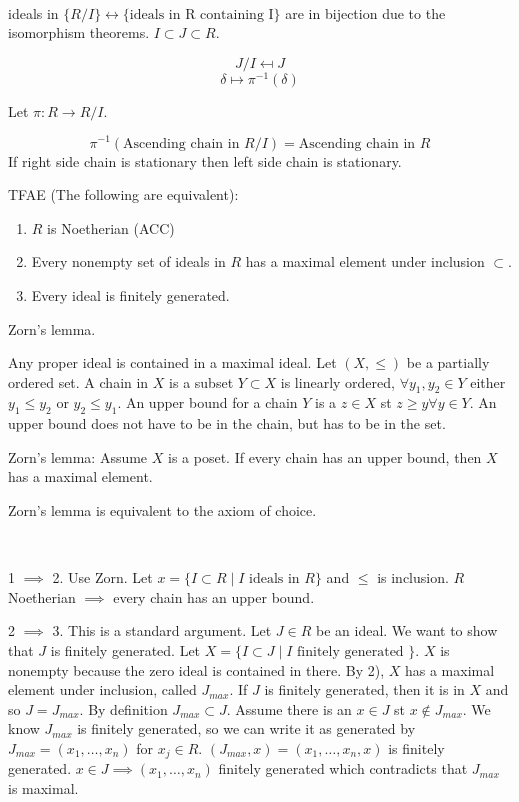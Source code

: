 \documentclass{./template}
\begin{document}
  {\proof ~

  {\rec ideals in $\{R/I\} \leftrightarrow \{\text{ideals in R containing I}\}$ are in bijection due to the isomorphism theorems. $I\subset J \subset R$.
  
  $$J/I\mapsfrom J$$
  $$\delta \mapsto \pi^{-1}(\delta)$$

  Let $\pi : R \to R/I$.
  
  $$\pi^{-1}(\text{Ascending chain in } R/I) = \text{Ascending chain in } R$$
  If right side chain is stationary then left side chain is stationary.
  }

  {\lemma TFAE (The following are equivalent):
  \begin{enumerate}[1)]
    \item{$R$ is Noetherian (ACC)}
    \item{Every nonempty set of ideals in $R$ has a maximal element under inclusion $\subset$.}
    \item{Every ideal is finitely generated.}
  \end{enumerate}
  }

  {\rec Zorn's lemma.
  
  Any proper ideal is contained in a maximal ideal. Let $(X,\leq)$ be a partially ordered set. A chain in $X$ is a subset $Y\subset X$ is linearly ordered, $\forall y_1,y_2\in Y$ either $y_1\leq y_2$ or $y_2 \leq y_1$. An upper bound for a chain $Y$ is a $z \in X$ st $z\geq y \forall y\in Y$. An upper bound does not have to be in the chain, but has to be in the set.

  Zorn's lemma: Assume $X$ is a poset. If every chain has an upper bound, then $X$ has a maximal element.

  Zorn's lemma is equivalent to the axiom of choice. 
  }

  {\proof ~

  1 $\implies$ 2. Use Zorn. Let $x=\{I\subset R\mid I \text{ ideals in } R \}$ and $\leq$ is inclusion. $R$ Noetherian $\implies$ every chain has an upper bound.

  2 $\implies$ 3. This is a standard argument. Let $J\in R$ be an ideal. We want to show that $J$ is finitely generated. Let $X=\{I\subset J \mid I \text{ finitely generated }\}$. $X$ is nonempty because the zero ideal is contained in there. By 2), $X$ has a maximal element under inclusion, called $J_{max}$. If $J$ is finitely generated, then it is in $X$ and so $J=J_{max}$. By definition $J_{max}\subset J$. Assume there is an $x\in J$ st $x\not\in J_{max}$. We know $J_{max}$ is finitely generated, so we can write it as generated by $J_{max}=(x_1,\ldots,x_n)$ for $x_j\in R$. $(J_{max},x) = (x_1,\ldots,x_n,x)$ is finitely generated. $x\in J \implies (x_1,\ldots,x_n)$ finitely generated which contradicts that $J_{max}$ is maximal.

}}
\end{document}
